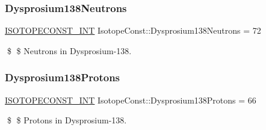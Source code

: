 \subsubsection{\texorpdfstring{Dysprosium138\+Neutrons}{Dysprosium138Neutrons}}
{\footnotesize\ttfamily \mbox{\hyperlink{group___isotope_const-_macros_ga5f18360b3e99483a35c32d789e62621c}{I\+S\+O\+T\+O\+P\+E\+C\+O\+N\+S\+T\+\_\+\+I\+NT}} Isotope\+Const\+::\+Dysprosium138\+Neutrons = 72}

\$ \$ Neutrons in Dysprosium-\/138. \mbox{\label{group___isotope_const-_dysprosium-_dy138_ga8bd631edc404e007de8b736db91b54a7}} 
\subsubsection{\texorpdfstring{Dysprosium138\+Protons}{Dysprosium138Protons}}
{\footnotesize\ttfamily \mbox{\hyperlink{group___isotope_const-_macros_ga5f18360b3e99483a35c32d789e62621c}{I\+S\+O\+T\+O\+P\+E\+C\+O\+N\+S\+T\+\_\+\+I\+NT}} Isotope\+Const\+::\+Dysprosium138\+Protons = 66}

\$ \$ Protons in Dysprosium-\/138. 